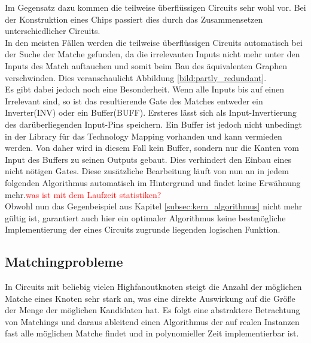\documentclass[11pt, a4paper, german]{article}
\newcommand{\TM}{Technology Mapping }
\begin{document}
Im Gegensatz dazu kommen die teilweise überflüssigen Circuits sehr wohl vor. Bei der Konstruktion eines Chips passiert dies durch das Zusammensetzen unterschiedlicher Circuits.\\
In den meisten Fällen werden die teilweise überflüssigen Circuits automatisch bei der  Suche der Matche gefunden, da die irrelevanten Inputs nicht mehr unter den Inputs des Match auftauchen und somit beim Bau des äquivalenten Graphen verschwinden. Dies veranschaulicht Abbildung \ref{bild:partly_redundant}. \\
Es gibt dabei jedoch noch eine Besonderheit. Wenn alle Inputs bis auf einen Irrelevant sind, so ist das resultierende Gate des Matches entweder ein Inverter(INV) oder ein Buffer(BUFF). Ersteres lässt sich als Input-Invertierung des darüberliegenden Input-Pins speichern. Ein Buffer ist jedoch nicht unbedingt in der Library für das \TM vorhanden und kann vermieden werden. Von daher wird in diesem Fall kein Buffer, sondern nur die Kanten vom Input des Buffers zu seinen Outputs gebaut. Dies verhindert den Einbau eines nicht nötigen Gates. Diese zusätzliche Bearbeitung läuft von nun an in jedem folgenden Algorithmus automatisch im Hintergrund und findet keine Erwähnung mehr.\textcolor{red}{was ist mit dem Laufzeit statistiken?}\\
 Obwohl nun das Gegenbeispiel aus Kapitel \ref{subsec:kern_algorithmus} nicht mehr gültig ist, garantiert auch hier ein optimaler Algorithmus keine bestmögliche Implementierung der eines Circuits zugrunde liegenden logischen Funktion.
 
 
\subsection{Matchingprobleme}
\label{subsec:match_kandidaten}
In Circuits mit beliebig vielen Highfanoutknoten steigt die Anzahl der möglichen Matche eines Knoten sehr stark an, was eine direkte Auswirkung auf die Größe der Menge der möglichen Kandidaten hat. Es folgt eine abstraktere Betrachtung von Matchings und daraus ableitend einen Algorithmus der auf realen Instanzen fast alle möglichen Matche findet und in polynomieller Zeit implementierbar ist.
\end{document}

